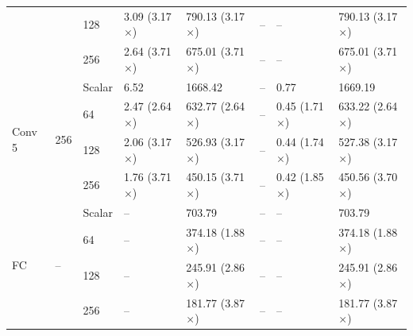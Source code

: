 \begin{table}[htbp]
\begin{tabular}{llllllll}
 &  & 128 & 3.09 (3.17$\times$) & 790.13 (3.17$\times$) & -- & -- & 790.13 (3.17$\times$) \\
 &  & 256 & 2.64 (3.71$\times$) & 675.01 (3.71$\times$) & -- & -- & 675.01 (3.71$\times$) \\
\midrule
\multirow{4}{*}{Conv 5} & \multirow{4}{*}{256} & Scalar & 6.52 & 1668.42 & -- & 0.77 & 1669.19 \\
 &  & 64 & 2.47 (2.64$\times$) & 632.77 (2.64$\times$) & -- & 0.45 (1.71$\times$) & 633.22 (2.64$\times$) \\
 &  & 128 & 2.06 (3.17$\times$) & 526.93 (3.17$\times$) & -- & 0.44 (1.74$\times$) & 527.38 (3.17$\times$) \\
 &  & 256 & 1.76 (3.71$\times$) & 450.15 (3.71$\times$) & -- & 0.42 (1.85$\times$) & 450.56 (3.70$\times$) \\
\midrule
\multirow{4}{*}{FC} & \multirow{4}{*}{--} & Scalar & -- & 703.79 & -- & -- & 703.79 \\
 &  & 64 & -- & 374.18 (1.88$\times$) & -- & -- & 374.18 (1.88$\times$) \\
 &  & 128 & -- & 245.91 (2.86$\times$) & -- & -- & 245.91 (2.86$\times$) \\
 &  & 256 & -- & 181.77 (3.87$\times$) & -- & -- & 181.77 (3.87$\times$) \\
\bottomrule
\end{tabular}
\end{table}
